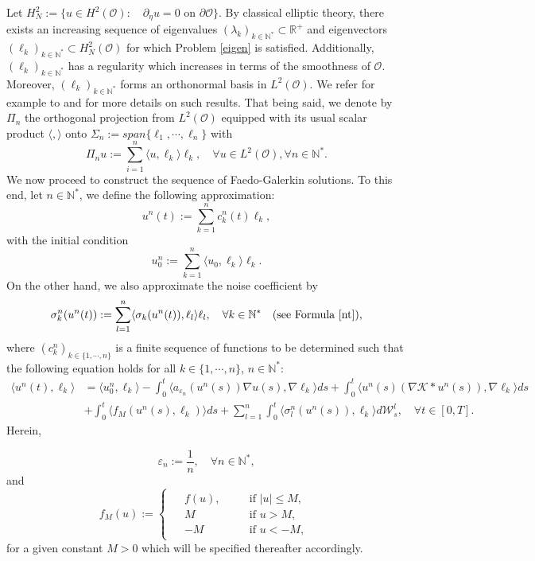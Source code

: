\documentclass[10pt,number,preprint,times]{elsarticle}
\numberwithin{equation}{section} %
\begin{document}
\noindent
Let $H^2_N:=\{u \in H^2(\mathcal{O}): \quad \partial_\eta u=0 \text{ on } \partial \mathcal{O}\}.$ By classical elliptic theory, there exists an increasing sequence of eigenvalues $\left(\lambda_k\right)_{k \in \mathbb{N}^*}  \subset \mathbb{R}^+$ and eigenvectors $\left(\ell_k\right)_{k \in \mathbb{N}^*} \subset H^2_N(\mathcal{O})$ for which Problem \eqref{eigen} is satisfied. Additionally, $\left(\ell_k\right)_{k \in \mathbb{N}^*}$ has a regularity which increases in terms of the smoothness of $\mathcal{O}$. Moreover, $\left(\ell_k\right)_{k \in \mathbb{N}^*}$ forms an orthonormal basis in $L^2(\mathcal{O})$. We refer for example to \cite[Section 4]{bendahmane2022martingale} and \cite[Section 3]{garcke2016global} for more details on such results. That being said, we denote by $\Pi_n$ the orthogonal projection from $L^2(\mathcal{O})$ equipped with its usual scalar product $\langle,\rangle$ onto $\Sigma_n:=span\{\ell_1,\cdots,\ell_n\}$ with
$$
\Pi_n u:= \sum_{i=1}^n \langle u, \ell_k \rangle \ell_k, \quad \forall u \in L^2(\mathcal{O}), \forall n \in \mathbb{N}^*.
$$
We now proceed to construct the sequence of Faedo-Galerkin solutions. To this end, let $n \in \mathbb{N}^*$, we define the following approximation:
$$
u^n(t):=\sum_{k=1}^n  c_k^n(t) \ell_k,
$$
with the initial condition 
$$
u^n_0:=\sum_{k=1}^n \langle u_0,\ell_k \rangle \ell_k.
$$
On the other hand, we also approximate the noise coefficient by
$$
\sigma^n_k(u^n(t)):=\sum_{l=1}^n  \langle \sigma_{k}(u^n(t)),\ell_l \rangle  \ell_l, \quad  \forall  k \in \mathbb{N}^* \quad (\textrm{see Formula } \eqref{nt}),
$$
where $\left(c_k^n\right)_{k \in \{1,\cdots,n\}}$ is a finite sequence of functions to be determined such that the following equation holds for all $k \in \{1,\cdots,n\}$, $n\in \mathbb{N}^*$:
\begin{equation}\label{galrk}
	\begin{split}
	\langle u^n(t),\ell_k \rangle&=\langle u^n_0,\ell_k \rangle-\int_0^t \langle a_{\varepsilon_n}(u^n(s)) \nabla u(s), \nabla \ell_k \rangle ds+\int_0^t\langle u^n(s)\left(\nabla \mathcal{K} \ast u^n(s)\right), \nabla \ell_k \rangle ds\\
	&+\int_0^t\langle f_M(u^n(s),\ell_k)\rangle ds+\sum_{l=1}^n \int_{0}^t \langle \sigma_{l}^n(u^n(s)),\ell_k\rangle d\mathcal{W}^l_s, \quad \forall t \in [0,T].
	\end{split}
\end{equation}
\noindent
Herein,

{
$$
\varepsilon_n:=\dfrac{1}{n}, \quad \forall n \in \mathbb{N}^*,
$$
}
and
\begin{equation}
	\label{trunc}
f_M(u):=
\begin{cases} 
\begin{split}
&f(u), \quad &&\text{if } \vert u \vert \leq M,\\
&M \quad &&\text{if } u> M,\\
&-M \quad &&\text{if } u<-M,
\end{split}
\end{cases}
\end{equation}
for a given constant $M>0$ which will be specified thereafter accordingly.
\end{document}
